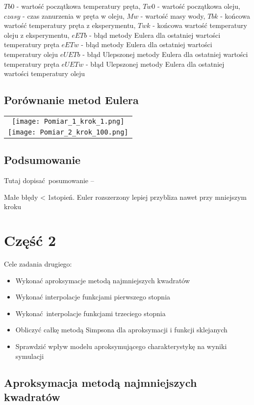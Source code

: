 \documentclass[varwidth,12pt,a4paper]{article}
\begin{document}
$Tb0$ - wartość początkowa temperatury pręta,
$Tw0$ - wartość początkowa oleju,
$czasy$ - czas zanurzenia w pręta w oleju,
$Mw$ - wartość masy wody,
$Tbk$ - końcowa wartość temperatury pręta z eksperymentu,
$Twk$ - końcowa wartość temperatury oleju z eksperymentu,
$eETb$ - błąd metody Eulera dla ostatniej wartości temperatury pręta
$eETw$ - błąd metody Eulera dla ostatniej wartości temperatury oleju
$eUETb$ - błąd Ulepszonej metody Eulera dla ostatniej wartości temperatury pręta
$eUETw$ - błąd Ulepszonej metody Eulera dla ostatniej wartości temperatury oleju

\subsection{Porównanie metod Eulera}

\begin{tabular}{c}
    \texttt{[image: Pomiar\_1\_krok\_1.png]} \\
    \texttt{[image: Pomiar\_2\_krok\_100.png]} 
\end{tabular}

\subsection{Podsumowanie}

Tutaj dopisać posumowanie --

Małe błędy < 1stopień.
Euler rozszerzony lepiej przybliza nawet przy mniejszym kroku

\section{Część 2}

Cele zadania drugiego:

\begin{itemize}
  \item Wykonać aproksymacje metodą najmniejszych kwadratów
  \item Wykonać interpolacje funkcjami pierwszego stopnia
  \item Wykonać interpolacje funkcjami trzeciego stopnia
  \item Obliczyć całkę metodą Simpsona dla aproksymacji i funkcji sklejanych
  \item Sprawdzić wpływ modelu aproksymującego charakterystykę na wyniki symulacji
\end{itemize}

\subsection{Aproksymacja metodą najmniejszych kwadratów}
\end{document}
